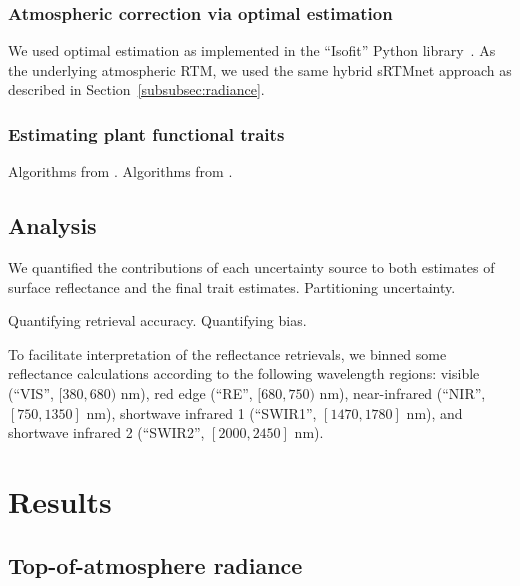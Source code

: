 \documentclass[draft]{agujournal2019}
\begin{document}
\subsubsection{Atmospheric correction via optimal estimation}\label{subsubsec:isofit}

We used optimal estimation as implemented in the ``Isofit'' Python library~\cite{thompson2019optimal,thompson2018optimal}.
As the underlying atmospheric RTM, we used the same hybrid sRTMnet approach as described in Section~\ref{subsubsec:radiance}.

\subsubsection{Estimating plant functional traits}\label{subsubsec:traits}

Algorithms from .
Algorithms from .

\subsection{Analysis}\label{subsec:analysis}

We quantified the contributions of each uncertainty source to both estimates of surface reflectance and the final trait estimates.
Partitioning uncertainty.

Quantifying retrieval accuracy.
Quantifying bias.

To facilitate interpretation of the reflectance retrievals, we binned some reflectance calculations according to the following wavelength regions:
visible (``VIS'', $[380, 680)$ nm), %
red edge (``RE'', $[680, 750)$ nm), %
near-infrared (``NIR'', $[750, 1350]$ nm),
shortwave infrared 1 (``SWIR1'', $[1470, 1780]$ nm),
and shortwave infrared 2 (``SWIR2'', $[2000, 2450]$ nm).

\section{Results}\label{sec:results}

\subsection{Top-of-atmosphere radiance}\label{subsec:results-radiance}
\end{document}
